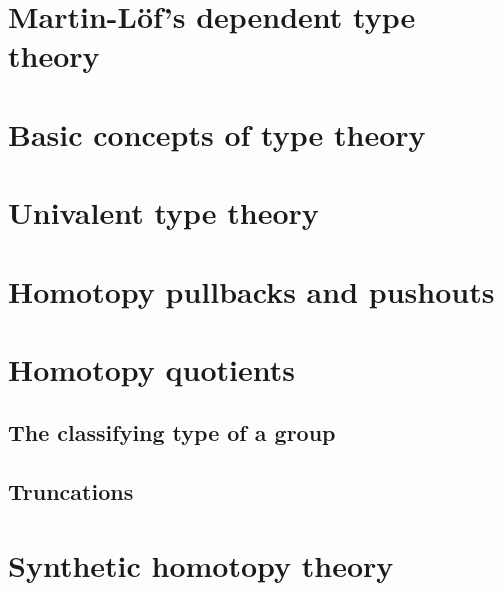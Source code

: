 \documentclass[11pt,draft]{memoir} %
\begin{document}
\mainmatter

\renewcommand{\thechapter}{\Roman{chapter}}

\chapter{Martin-L\"of's dependent type theory}






\chapter{Basic concepts of type theory}






\chapter{Univalent type theory}




\chapter{Homotopy pullbacks and pushouts}






\chapter{Homotopy quotients}



\section{The classifying type of a group}

\section{Truncations}

\chapter{Synthetic homotopy theory}






%

\backmatter

\printbibliography

\printindex
\end{document}
